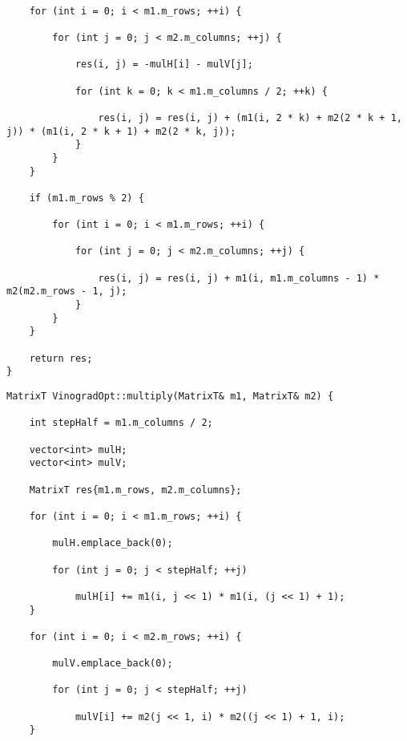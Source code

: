 \clearpage

\begin{lstlisting}[label=lst:vin_2, caption=Функция умножения матриц методом Винограда (часть 2)]

    for (int i = 0; i < m1.m_rows; ++i) {

        for (int j = 0; j < m2.m_columns; ++j) {

            res(i, j) = -mulH[i] - mulV[j];

            for (int k = 0; k < m1.m_columns / 2; ++k) {

                res(i, j) = res(i, j) + (m1(i, 2 * k) + m2(2 * k + 1, j)) * (m1(i, 2 * k + 1) + m2(2 * k, j));
            }
        }
    }

    if (m1.m_rows % 2) {

        for (int i = 0; i < m1.m_rows; ++i) {

            for (int j = 0; j < m2.m_columns; ++j) {  

                res(i, j) = res(i, j) + m1(i, m1.m_columns - 1) * m2(m2.m_rows - 1, j);
            }
        }
    }

    return res;    
}
\end{lstlisting}

\clearpage

\begin{lstlisting}[label=lst:vin_opt_1, caption=Функция умножения матриц оптимизированным методом Винограда (часть 1)]
MatrixT VinogradOpt::multiply(MatrixT& m1, MatrixT& m2) {

    int stepHalf = m1.m_columns / 2;

    vector<int> mulH;
    vector<int> mulV;

    MatrixT res{m1.m_rows, m2.m_columns};

    for (int i = 0; i < m1.m_rows; ++i) {

        mulH.emplace_back(0);

        for (int j = 0; j < stepHalf; ++j) 

            mulH[i] += m1(i, j << 1) * m1(i, (j << 1) + 1); 
    }

    for (int i = 0; i < m2.m_rows; ++i) {

        mulV.emplace_back(0);

        for (int j = 0; j < stepHalf; ++j) 

            mulV[i] += m2(j << 1, i) * m2((j << 1) + 1, i);
    }
\end{lstlisting}

